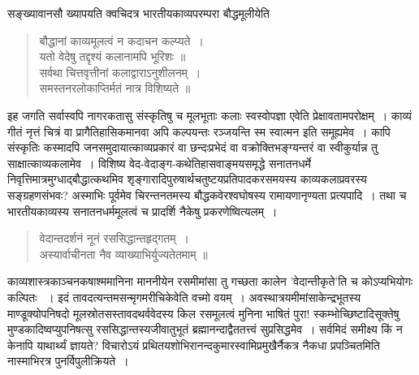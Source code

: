 {\dev सङ्ख्यावानसौ ख्यापयति क्वचिदत्र भारतीयकाव्यपरम्परा बौद्धमूलीयेति}
\vskip -8pt

\begin{quote}
{\dev बौद्धानां काव्यमूलत्वं न कदाचन कल्प्यते~।}\\
{\dev यतो वेदेषु तद्दृश्यं कलानामपि भूरिशः ॥}\\[5pt]
{\dev सर्वथा चित्तवृत्तीनां कलाद्वाराऽनुशीलनम्~।}\\
{\dev समस्तनरलोकाप्तिर्मतं नात्र विशिष्यते ॥}
\end{quote}
\vskip -8pt

{\dev इह जगति सर्वास्वपि नागरकतासु संस्कृतिषु च मूलभूताः कलाः स्वस्वोपज्ञा एवेति प्रेक्षावता\-मपरोक्षम्~। काव्यं गीतं नृत्तं चित्रं वा प्रागैतिहासिकमानवा अपि कल्पयन्तः रञ्जयन्ति स्म स्वात्मन इति समूह्यमेव~। कापि संस्कृतिः कस्मादपि जनसमुदायात्काव्यप्रकारं वा छन्दःप्रभेदं वा वक्रोक्तिभङ्ग्यन्तरं वा स्वीकुर्यान्न तु साक्षात्काव्यकलामेव~। विशिष्य वेद-वेदाङ्ग-कथेतिहास\-वाङ्मयसमृद्धे सनातनधर्मे निवृत्तिमात्रमुग्धाद्बौद्धात्कथमिव शृङ्गारादिपुरुषार्थचतुष्टयप्रतिपाद\-करसमयस्य काव्यकलाप्रवरस्य सङ्ग्रहणसंभवः? अस्माभिः पूर्वमेव चिरन्तनतमस्य बौद्ध\-कवेरश्वघोषस्य रामायणानृण्यता प्रत्यपादि~। तथा च भारतीयकाव्यस्य सनातनधर्ममूलत्वं च प्रादर्शि नैकेषु प्रकरणेष्वित्यलम्~।}
\vskip -8pt

\begin{quote}
{\dev वेदान्तदर्शनं नूनं रससिद्धान्तहृद्गतम्~।}\\
{\dev अस्यार्वाचीनता नैव व्याख्याभिर्युज्यतेतमाम् ॥}
\end{quote}
\vskip -7pt

{\dev काव्यशास्त्रकाञ्चनकषाश्ममानिना माननीयेन रसमीमांसा तु गच्छता कालेन ’वेदान्तीकृते’ति च कोऽप्यभियोगः कल्पितः} {\dev~। इदं तावदत्यन्तमसन्मृगमरीचि\-केवेति वच्मो वयम्~। अवस्था\-त्रयमीमांसाकेन्द्रभूतस्य माण्डूक्योपनिषदो मूलस्रोतसस्तावद\-थर्ववेदस्य किल रस\-मूलत्वं मुनिना भाषितं पुरा! स्कम्भोच्छिष्टादिसूक्तेषु मुण्डकादिष्वप्युपनि\-षत्सु रस\-सिद्धान्तस्य\break जीवातुभूतं ब्रह्मानन्दाद्वैततत्त्वं सुप्रसिद्धमेव~। सर्वमिदं समीक्ष्य किं न केनापि याथार्थ्यं ज्ञायते? विचारोऽयं प्रथितयशोभिरानन्दकुमारस्वामिप्रमुखैर्नैकत्र नैकधा प्रपञ्चितमिति नास्माभिरत्र पुनर्विपुलीक्रियते~।}   

